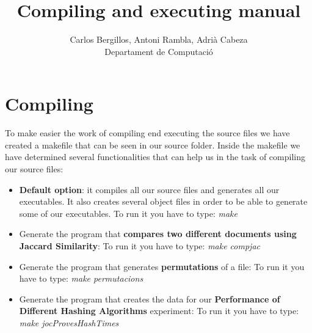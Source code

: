 \documentclass[12pt]{article}
\author{Carlos Bergillos, Antoni Rambla, Adrià Cabeza\\ Departament de Computació}
\title{Compiling and executing manual}
\begin{document}
  \maketitle  
   \newpage
   \section{Compiling}
   To make easier the work of compiling end executing the source files we have created a makefile that can be seen in our source folder. Inside the makefile we have determined several functionalities that can help us in the task of compiling our source files:
   
   \begin{itemize}
   \item \textbf{Default option}: it compiles all our source files and generates all our executables. It also creates several object files in order to be able to generate some of our executables. 
   To run it you have to type: \textit{make}
   \item Generate the program that \textbf{compares two different documents using Jaccard Similarity}:
   To run it you have to type: \textit{make compjac}
  
  
   \item Generate the program that generates \textbf{permutations} of a file:
   To run it you have to type: \textit{make permutacions}
 
   
\item Generate the program that creates the data for our \textbf{Performance of Different Hashing Algorithms} experiment:
   To run it you have to type: \textit{make jocProvesHashTimes}
  

\end{itemize}
\end{document}
